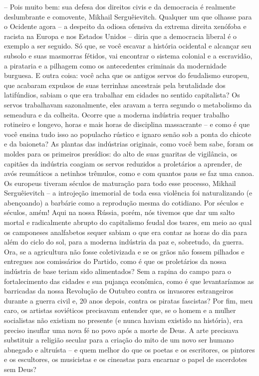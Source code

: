 -- Pois muito bem: sua defesa dos direitos civis e da democracia é
realmente deslumbrante e comovente, Mikhail Serguêievitch. Qualquer um
que olhasse para o Ocidente agora -- a despeito da odiosa ofensiva da
extrema direita xenófoba e racista na Europa e nos Estados Unidos --
diria que a democracia liberal é o exemplo a ser seguido. Só que, se
você escavar a história ocidental e alcançar seu subsolo e suas
masmorras fétidos, vai encontrar o sistema colonial e a escravidão, a
pirataria e a pilhagem como os antecedentes criminais da modernidade
burguesa. E outra coisa: você acha que os antigos servos do feudalismo
europeu, que acabaram expulsos de suas terrinhas ancestrais pela
brutalidade dos latifúndios, sabiam o que era trabalhar em cidades no
sentido capitalista? Os servos trabalhavam sazonalmente, eles aravam a
terra segundo o metabolismo da semeadura e da colheita. Ocorre que a
moderna indústria requer trabalho rotineiro e longevo, horas e mais
horas de disciplina massacrante -- e como é que você ensina tudo isso ao
populacho rústico e ignaro senão sob a ponta do chicote e da baioneta?
As plantas das indústrias originais, como você bem sabe, foram os moldes
para os primeiros presídios: do alto de suas guaritas de vigilância, os
capitães da indústria coagiam os servos reduzidos a proletários a
aprender, de avós reumáticos a netinhos trêmulos, como e com quantos
paus se faz uma canoa. Os europeus tiveram séculos de maturação para
todo esse processo, Mikhail Serguêievitch -- a introjeção imemorial de
toda essa violência foi naturalizando (e abençoando) a barbárie como a
reprodução mesma do cotidiano. Por séculos e séculos, amém! Aqui na
nossa Rússia, porém, nós tivemos que dar um salto mortal e radicalmente
abrupto do capitalismo feudal dos tsares, em meio ao qual os camponeses
analfabetos sequer sabiam o que era contar as horas do dia para além do
ciclo do sol, para a moderna indústria da paz e, sobretudo, da guerra.
Ora, se a agricultura não fosse coletivizada e se os grãos não fossem
pilhados e entregues aos comissários do Partido, como é que os
proletários da nossa indústria de base teriam sido alimentados? Sem a
rapina do campo para o fortalecimento das cidades e sua pujança
econômica, como é que levantaríamos as barricadas da nossa Revolução de
Outubro contra os invasores estrangeiros durante a guerra civil e, 20
anos depois, contra os piratas fascistas? Por fim, meu caro, os artistas
soviéticos precisavam entender que, se o homem e a mulher socialistas
não existiam no presente (e nunca haviam existido na história), era
preciso insuflar uma nova fé no povo após a morte de Deus. A arte
precisava substituir a religião secular para a criação do mito de um
novo ser humano abnegado e altruísta -- e quem melhor do que os poetas e
os escritores, os pintores e os escultores, os musicistas e os cineastas
para encarnar o papel de sacerdotes sem Deus?

